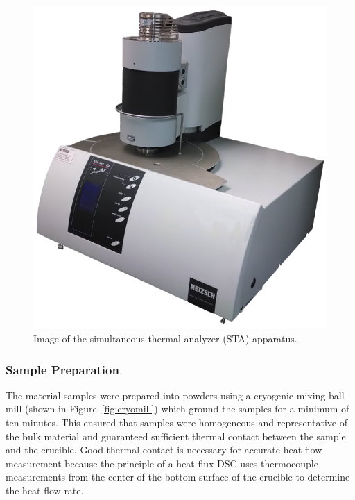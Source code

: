 \documentclass[12pt,oneside]{book}
\begin{document}
\begin{figure}[!ht]
\centering
\includegraphics[width=.75\columnwidth]{Figures/STA.png}
\caption[Image of the Simultaneous Thermal Analyzer (STA) Apparatus]{Image of the simultaneous thermal analyzer (STA) apparatus.}
\label{fig:STA_apparatus}
\end{figure}

\subsubsection{Sample Preparation}

The material samples were prepared into powders using a cryogenic mixing ball mill (shown in Figure~\ref{fig:cryomill}) which ground the samples for a minimum of ten minutes. This ensured that samples were homogeneous and representative of the bulk material and guaranteed sufficient thermal contact between the sample and the crucible. Good thermal contact is necessary for accurate heat flow measurement because the principle of a heat flux DSC uses thermocouple measurements from the center of the bottom surface of the crucible to determine the heat flow rate.
\end{document}
